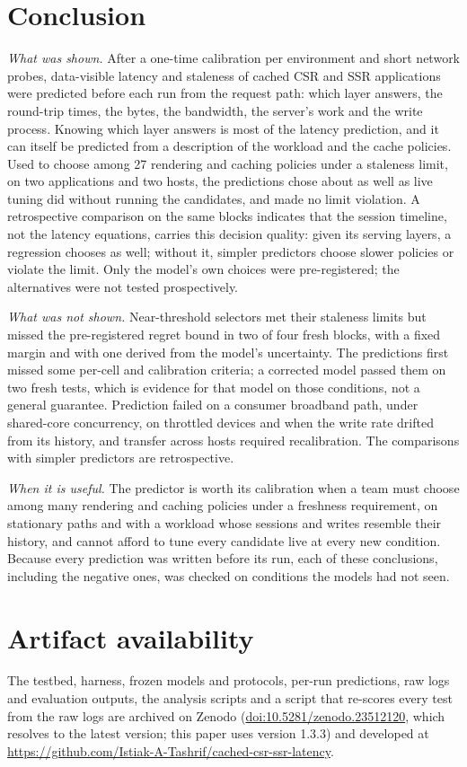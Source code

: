 \documentclass[acmsmall,review,nonacm]{acmart}
\begin{document}
\section{Conclusion}
\emph{What was shown.} After a one-time calibration per environment and short network probes, data-visible latency and staleness of cached CSR and SSR applications were predicted before each run from the request path: which layer answers, the round-trip times, the bytes, the bandwidth, the server's work and the write process. Knowing which layer answers is most of the latency prediction, and it can itself be predicted from a description of the workload and the cache policies. Used to choose among 27 rendering and caching policies under a staleness limit, on two applications and two hosts, the predictions chose about as well as live tuning did without running the candidates, and made no limit violation. A retrospective comparison on the same blocks indicates that the session timeline, not the latency equations, carries this decision quality: given its serving layers, a regression chooses as well; without it, simpler predictors choose slower policies or violate the limit. Only the model's own choices were pre-registered; the alternatives were not tested prospectively.

\emph{What was not shown.} Near-threshold selectors met their staleness limits but missed the pre-registered regret bound in two of four fresh blocks, with a fixed margin and with one derived from the model's uncertainty. The predictions first missed some per-cell and calibration criteria; a corrected model passed them on two fresh tests, which is evidence for that model on those conditions, not a general guarantee. Prediction failed on a consumer broadband path, under shared-core concurrency, on throttled devices and when the write rate drifted from its history, and transfer across hosts required recalibration. The comparisons with simpler predictors are retrospective.

\emph{When it is useful.} The predictor is worth its calibration when a team must choose among many rendering and caching policies under a freshness requirement, on stationary paths and with a workload whose sessions and writes resemble their history, and cannot afford to tune every candidate live at every new condition. Because every prediction was written before its run, each of these conclusions, including the negative ones, was checked on conditions the models had not seen.

\section*{Artifact availability}
The testbed, harness, frozen models and protocols, per-run predictions, raw logs and evaluation outputs, the analysis scripts and a script that re-scores every test from the raw logs are archived on Zenodo (\href{https://doi.org/10.5281/zenodo.23512120}{doi:10.5281/zenodo.23512120}, which resolves to the latest version; this paper uses version 1.3.3) and developed at \url{https://github.com/Istiak-A-Tashrif/cached-csr-ssr-latency}.
\end{document}
